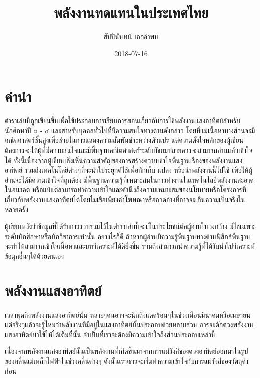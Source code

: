 \documentclass[11pt]{article}
\author{สัปปินันทน์ เอกอำพน}
\date{2018-07-16}
\title{พลังงานทดแทนในประเทศไทย}
\begin{document}
\maketitle
\tableofcontents

\maketitle

\section{คำนำ}
\label{sec:orgab46bd3}

ตำราเล่มนี้ถูกเขียนขึ้นเพื่อใช้ประกอบการเรียนการสอนเกี่ยวกับการใช้พลังงานแสงอาทิตย์สำหรับนักศึกษาปี ๓ - ๔ และสำหรับบุคคลทั่วไปที่มีความสนใจทางด้านดังกล่าว โดยที่แม้เนื้อหาบางส่วนจะมีคณิตศาสตร์ชั้นสูงเพื่อช่วยในการแสดงความสัมพันธ์ระหว่างตัวแปร แต่ความตั้งใจหลักของผู้เขียนต้องการจะให้ผู้ที่มีความสนใจและมีพื้นฐานคณิตศาสตร์ระดับมัธยมปลายควรจะสามารถอ่านแล้วเข้าใจได้ ทั้งนี้เนื่องจากผู้เขียนเล็งเห็นความสำคัญของการสร้างความเข้าใจพื้นฐานเรื่องของพลังงานแสงอาทิตย์ รวมถึงเทคโนโลยีต่างๆที่จะนำไประยุกต์ใช้เพื่อกักเก็บ แปลง หรือนำพลังงานนี้ไปใช้ เพื่อให้ผู้อ่านจะได้มีความเข้าใจที่ถูกต้อง มีพื้นฐานความรู้ที่เหมาะสมในการทำงานในเทคโนโลยีพลังงานสะอาดในอนาคต หรือแม้แต่สามารถทำความเข้าใจและคำนึงถึงความเหมาะสมของนโยบายหรือโครงการที่เกี่ยวกับพลังงานแสงอาทิตย์ได้โดยไม่เชื่อเพียงคำโฆษณาหรืออวดอ้างที่อาจจะเกินความเป็นจริงในหลายครั้ง

ผู้เขียนหวังว่าข้อมูลที่ได้รับการรวบรวมไว้ในตำราเล่มนี้จะเป็นประโยชน์ต่อผู้อ่านในวงกว้าง มิใช่เฉพาะระดับนักศึกษาหรือนักวิชาการเท่านั้น อย่างไรก็ดี ถ้าหากผู้อ่านมีความรู้พื้นฐานทางด้านฟิสิกส์พื้นฐาน จะทำให้สามารถเข้าใจเนื้อหาและบทวิเคราะห์ได้ดียิ่งขึ้น รวมถึงสามารถนำความรู้ที่ได้รับนำไปวิเคราะห์ข้อมูลอื่นๆได้ด้วยตนเอง

\section{พลังงานแสงอาทิตย์}
\label{sec:org89dd86a}

เวลาพูดถึงพลังงานแสงอาทิตย์นั้น หลายๆคนอาจจะนึกถึงแดดร้อนๆในช่วงเดือนมีนาคมหรือเมษายน แต่จริงๆแล้วจะรู้ไหมว่าพลังงานที่มีอยู่ในแสงอาทิตย์นั้นประกอบด้วยหลายส่วน การจะตักตวงพลังงานแสงอาทิตย์มาใช้ให้ได้เต็มที่นั้น จำเป็นที่เราจะต้องมีความเข้าใจถึงส่วนประกอบเหล่านี้

เนื่องจากพลังงานแสงอาทิตย์นั้นเป็นพลังงานที่เกิดขึ้นมาจากการแผ่รังสีของดวงอาทิตย์ออกมาในรูปของคลื่นแม่เหล็กไฟฟ้าในช่วงคลื่นต่างๆ ดังนั้นเราควรจะเริ่มทำความเข้าใจกับการแผ่รังสีของวัตถุดำก่อน
\end{document}
